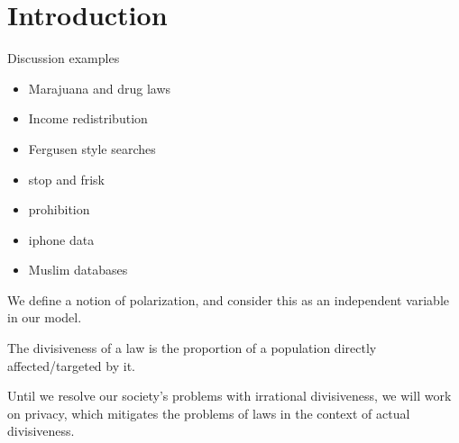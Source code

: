 %

\section{Introduction}
\label{sec:intro}

Discussion examples
\begin{itemize}
\item Marajuana and drug laws
\item Income redistribution
\item Fergusen style searches
\item stop and frisk
\item prohibition
\item iphone data
\item Muslim databases
\end{itemize}

We define a notion of polarization, and consider this as an independent variable in our model.

The divisiveness of a law is the proportion of a population directly affected/targeted by it.

Until we resolve our society's problems with irrational divisiveness, we will work on privacy, which mitigates the problems of laws in the context of actual divisiveness.

